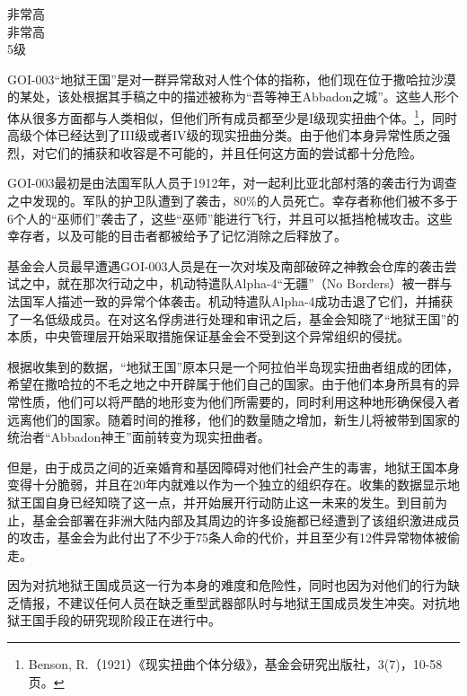 

\begin{scpboxbbwm}



非常高\\
非常高\\
5级

GOI-003“地狱王国”是对一群异常敌对人性个体的指称，他们现在位于撒哈拉沙漠的某处，该处根据其手稿之中的描述被称为“吾等神王Abbadon之城”。这些人形个体从很多方面都与人类相似，但他们所有成员都至少是I级现实扭曲个体。\footnote{Benson, R.（1921）《现实扭曲个体分级》，基金会研究出版社，3(7)，10-58页。}，同时高级个体已经达到了III级或者IV级的现实扭曲分类。由于他们本身异常性质之强烈，对它们的捕获和收容是不可能的，并且任何这方面的尝试都十分危险。

GOI-003最初是由法国军队人员于1912年，对一起利比亚北部村落的袭击行为调查之中发现的。军队的护卫队遭到了袭击，80\%的人员死亡。幸存者称他们被不多于6个人的“巫师们”袭击了，这些“巫师”能进行飞行，并且可以抵挡枪械攻击。这些幸存者，以及可能的目击者都被给予了记忆消除之后释放了。

基金会人员最早遭遇GOI-003人员是在一次对埃及南部破碎之神教会仓库的袭击尝试之中，就在那次行动之中，机动特遣队Alpha-4“无疆”（No Borders）被一群与法国军人描述一致的异常个体袭击。机动特遣队Alpha-4成功击退了它们，并捕获了一名低级成员。在对这名俘虏进行处理和审讯之后，基金会知晓了“地狱王国”的本质，中央管理层开始采取措施保证基金会不受到这个异常组织的侵扰。

根据收集到的数据，“地狱王国”原本只是一个阿拉伯半岛现实扭曲者组成的团体，希望在撒哈拉的不毛之地之中开辟属于他们自己的国家。由于他们本身所具有的异常性质，他们可以将严酷的地形变为他们所需要的，同时利用这种地形确保侵入者远离他们的国家。随着时间的推移，他们的数量随之增加，新生儿将被带到国家的统治者“Abbadon神王”面前转变为现实扭曲者。

但是，由于成员之间的近亲婚育和基因障碍对他们社会产生的毒害，地狱王国本身变得十分脆弱，并且在20年内就难以作为一个独立的组织存在。收集的数据显示地狱王国自身已经知晓了这一点，并开始展开行动防止这一未来的发生。到目前为止，基金会部署在非洲大陆内部及其周边的许多设施都已经遭到了该组织激进成员的攻击，基金会为此付出了不少于75条人命的代价，并且至少有12件异常物体被偷走。

因为对抗地狱王国成员这一行为本身的难度和危险性，同时也因为对他们的行为缺乏情报，不建议任何人员在缺乏重型武器部队时与地狱王国成员发生冲突。对抗地狱王国手段的研究现阶段正在进行中。

\end{scpboxbbwm}

